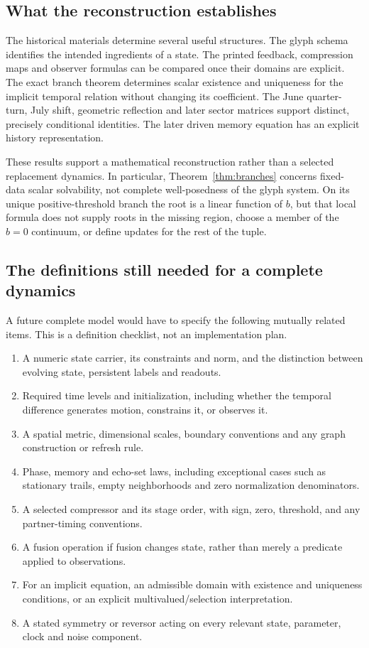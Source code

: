 \documentclass[11pt,a4paper]{article}
\theoremstyle{definition}
\numberwithin{equation}{section}
\begin{document}
\subsection{What the reconstruction establishes}

The historical materials determine several useful structures. The glyph
schema identifies the intended ingredients of a state. The printed
feedback, compression maps and observer formulas can be compared once
their domains are explicit. The exact branch theorem determines scalar
existence and uniqueness for the implicit temporal relation without
changing its coefficient. The June quarter-turn, July shift, geometric
reflection and later sector matrices support distinct, precisely
conditional identities. The later driven memory equation has an explicit
history representation.

These results support a mathematical reconstruction rather than a selected
replacement dynamics. In particular, Theorem~\ref{thm:branches} concerns
fixed-data scalar solvability, not complete well-posedness of the glyph
system. On its unique positive-threshold branch the root is a linear
function of $b$, but that local formula does not supply roots in the
missing region, choose a member of the $b=0$ continuum, or define updates
for the rest of the tuple.

\subsection{The definitions still needed for a complete dynamics}

A future complete model would have to specify the following mutually
related items. This is a definition checklist, not an implementation plan.

\begin{enumerate}
\item A numeric state carrier, its constraints and norm, and the distinction
between evolving state, persistent labels and readouts.
\item Required time levels and initialization, including whether the
temporal difference generates motion, constrains it, or observes it.
\item A spatial metric, dimensional scales, boundary conventions and any
graph construction or refresh rule.
\item Phase, memory and echo-set laws, including exceptional cases such as
stationary trails, empty neighborhoods and zero normalization denominators.
\item A selected compressor and its stage order, with sign, zero, threshold,
and any partner-timing conventions.
\item A fusion operation if fusion changes state, rather than merely a
predicate applied to observations.
\item For an implicit equation, an admissible domain with existence and
uniqueness conditions, or an explicit multivalued/selection interpretation.
\item A stated symmetry or reversor acting on every relevant state,
parameter, clock and noise component.
\end{enumerate}
\end{document}
